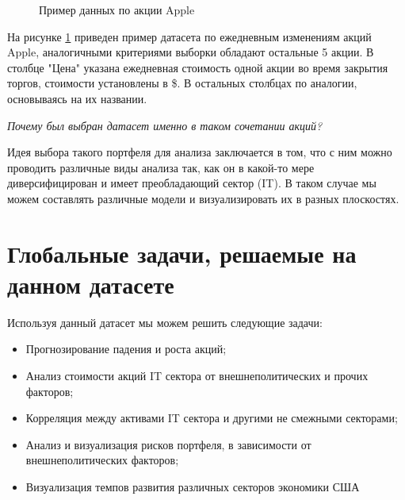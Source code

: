 \documentclass[12pt,a4paper]{article}
\begin{document}
\begin{figure}[h]
    \centering
    \caption{Пример данных по акции Apple}
    \label{fig:Stock1}
\end{figure}

\large На рисунке \ref{fig:Stock1} приведен пример датасета по ежедневным изменениям акций Apple, аналогичными критериями выборки обладают остальные 5 акции. В столбце "Цена" указана ежедневная стоимость одной акции во время закрытия торгов, стоимости установлены в \$. В остальных столбцах по аналогии, основываясь на их названии.

\large \textit {Почему был выбран датасет именно в таком сочетании акций?}

\large Идея выбора такого портфеля для анализа заключается в том, что с ним можно проводить различные виды анализа так, как он в какой-то мере диверсифицирован и имеет преобладающий сектор (IT). В таком случае мы можем составлять различные модели и визуализировать их в разных плоскостях.

\section{Глобальные задачи, решаемые на данном датасете}

\large Используя данный датасет мы можем решить следующие задачи:

\begin{minipage}{0.9\textwidth}
			\large
			\singlespacing 
            \begin{itemize}
            \item \normalsize Прогнозирование падения и роста акций;
            \item \normalsize Анализ стоимости акций IT сектора от внешнеполитических и прочих факторов;
            \item \normalsize Корреляция между активами IT сектора и другими не смежными секторами;
            \item \normalsize Анализ и визуализация рисков портфеля, в зависимости от внешнеполитических факторов;
            \item \normalsize Визуализация темпов развития различных секторов экономики США
            \end{itemize}
\end{minipage}\\[0.25cm]
\end{document}
